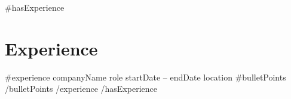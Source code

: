{{#hasExperience}}
\section{Experience}
\resumeSubHeadingListStart
  {{#experience}}
  \resumeSubheading
    { {{companyName}} }
    { {{role}} }
    { {{startDate}} -- {{endDate}} }
    { {{location}} }
  \resumeItemListStart
    {{#bulletPoints}}
    {{/bulletPoints}}
  \resumeItemListEnd
  {{/experience}}
\resumeSubHeadingListEnd
{{/hasExperience}}

